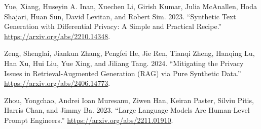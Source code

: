 \documentclass[conference]{IEEEtran}
\begin{document}
\begin{thebibliography}{00}
Yue, Xiang, Huseyin A. Inan, Xuechen Li, Girish Kumar, Julia McAnallen,
Hoda Shajari, Huan Sun, David Levitan, and Robert Sim. 2023.
{``Synthetic Text Generation with Differential Privacy: A Simple and
Practical Recipe.''} \url{https://arxiv.org/abs/2210.14348}.

Zeng, Shenglai, Jiankun Zhang, Pengfei He, Jie Ren, Tianqi Zheng,
Hanqing Lu, Han Xu, Hui Liu, Yue Xing, and Jiliang Tang. 2024.
{``Mitigating the Privacy Issues in Retrieval-Augmented Generation (RAG)
via Pure Synthetic Data.''} \url{https://arxiv.org/abs/2406.14773}.

Zhou, Yongchao, Andrei Ioan Muresanu, Ziwen Han, Keiran Paster, Silviu
Pitis, Harris Chan, and Jimmy Ba. 2023. {``Large Language Models Are
Human-Level Prompt Engineers.''} \url{https://arxiv.org/abs/2211.01910}.
\end{thebibliography}
\end{document}
